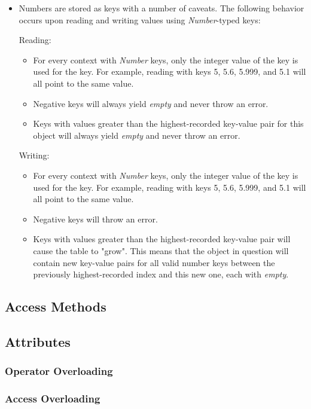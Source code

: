 \documentclass[12pt,letterpaper]{report}
\begin{document}
\begin{itemize}
  \item Numbers are stored as keys with a number of caveats. The following behavior occurs 
  upon reading and writing values using \textit{Number}-typed keys:
  
  Reading:
  \begin{itemize}
    \item For every context with \textit{Number} keys, only the integer value of the key is used for the key. For example, reading with keys 5, 5.6, 5.999, and 5.1 will all point to the same value.    
    \item Negative keys will always yield \textit{empty} and never throw an error.
    \item Keys with values greater than the highest-recorded key-value pair for this object will always yield \textit{empty} and never throw an error.      
  \end{itemize}

  Writing:
  \begin{itemize}
    \item For every context with \textit{Number} keys, only the integer value of the key is used for the key. For example, reading with keys 5, 5.6, 5.999, and 5.1 will all point to the same value.    
    \item Negative keys will throw an error.
    \item Keys with values greater than the highest-recorded key-value pair will cause the table to "grow". This means that the object in question will contain new key-value pairs for all valid number keys between the previously highest-recorded index and this new one, each with \textit{empty}.
  \end{itemize}
\end{itemize}


\subsection{Access Methods}\label{Access Methods}
  
\subsection{Attributes}\label{Attributes}
\subsubsection{Operator Overloading}\label{Operator Overloading}
\subsubsection{Access Overloading}\label{Access Overloading}
\end{document}
